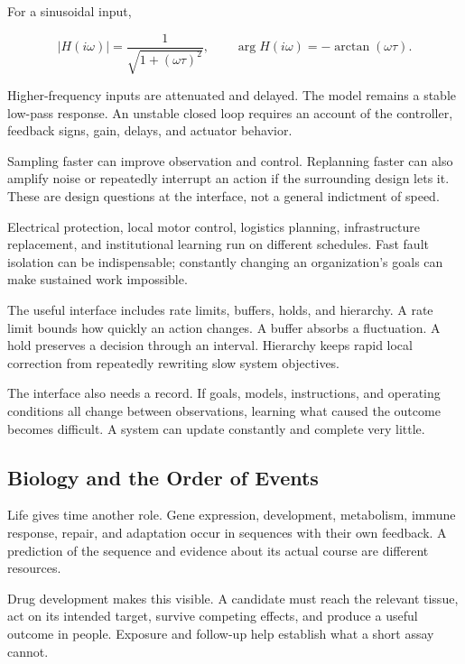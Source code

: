 For a sinusoidal input,

\begin{equation}
|H(i\omega)|=\frac{1}{\sqrt{1+(\omega\tau)^2}},
\qquad
\arg H(i\omega)=-\arctan(\omega\tau).
\end{equation}

Higher-frequency inputs are attenuated and delayed. The model remains a stable low-pass response. An unstable closed loop requires an account of the controller, feedback signs, gain, delays, and actuator behavior.

Sampling faster can improve observation and control. Replanning faster can also amplify noise or repeatedly interrupt an action if the surrounding design lets it. These are design questions at the interface, not a general indictment of speed.


Electrical protection, local motor control, logistics planning, infrastructure replacement, and institutional learning run on different schedules. Fast fault isolation can be indispensable; constantly changing an organization's goals can make sustained work impossible.

The useful interface includes rate limits, buffers, holds, and hierarchy. A rate limit bounds how quickly an action changes. A buffer absorbs a fluctuation. A hold preserves a decision through an interval. Hierarchy keeps rapid local correction from repeatedly rewriting slow system objectives.

The interface also needs a record. If goals, models, instructions, and operating conditions all change between observations, learning what caused the outcome becomes difficult. A system can update constantly and complete very little.

\subsection{Biology and the Order of Events}

Life gives time another role. Gene expression, development, metabolism, immune response, repair, and adaptation occur in sequences with their own feedback. A prediction of the sequence and evidence about its actual course are different resources.

Drug development makes this visible. A candidate must reach the relevant tissue, act on its intended target, survive competing effects, and produce a useful outcome in people. Exposure and follow-up help establish what a short assay cannot.

